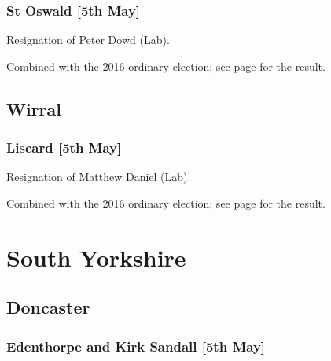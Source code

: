 \documentclass[a4paper,openany]{book}
\begin{document}
\begin{resultsiii}
\subsubsection*{St Oswald \hspace*{\fill}\nolinebreak[1]%
\enspace\hspace*{\fill}
[5th May]}


Resignation of Peter Dowd (Lab).

Combined with the 2016 ordinary election; see page \pageref{StOswaldSefton} for the result.

\subsection*{Wirral}

\subsubsection*{Liscard \hspace*{\fill}\nolinebreak[1]%
\enspace\hspace*{\fill}
[5th May]}


Resignation of Matthew Daniel (Lab).

Combined with the 2016 ordinary election; see page \pageref{LiscardWirral} for the result.

\section{South Yorkshire}

\subsection*{Doncaster}

\subsubsection*{Edenthorpe and Kirk Sandall \hspace*{\fill}\nolinebreak[1]%
\enspace\hspace*{\fill}
[5th May]}



\end{resultsiii}
\end{document}
